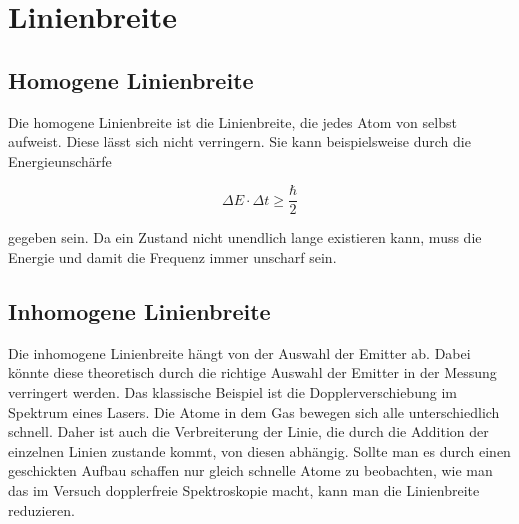 
\section{Linienbreite}

\subsection{Homogene Linienbreite}

Die homogene Linienbreite ist die Linienbreite, die jedes Atom von selbst aufweist. Diese lässt sich nicht verringern.
Sie kann beispielsweise durch die Energieunschärfe 

\begin{equation}
    \Delta E \cdot \Delta t  \geq   \frac{\hbar}{2}
\end{equation}

gegeben sein. Da ein Zustand nicht unendlich lange existieren kann, 
muss die Energie und damit die Frequenz immer unscharf sein.


\subsection{Inhomogene Linienbreite}

Die inhomogene Linienbreite hängt von der Auswahl der Emitter ab. Dabei könnte diese
theoretisch durch die richtige Auswahl der Emitter in der Messung verringert werden. Das 
klassische Beispiel ist die Dopplerverschiebung im Spektrum eines Lasers. Die Atome in dem Gas
bewegen sich alle unterschiedlich schnell. Daher ist auch die Verbreiterung der Linie, die
durch die Addition der einzelnen Linien zustande kommt, von diesen abhängig. Sollte man es durch einen
geschickten Aufbau schaffen nur gleich schnelle Atome zu beobachten, wie man 
das im Versuch dopplerfreie Spektroskopie macht, kann man die Linienbreite reduzieren.